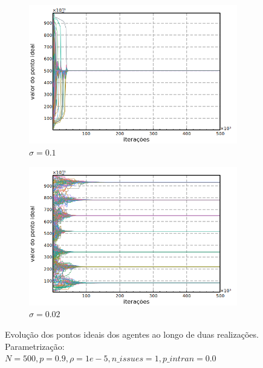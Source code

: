 \begin{figure}[h]
    \centering
    \begin{subfigure}[b]{0.49\textwidth}
      \includegraphics[width=\textwidth]{ims/timeseries1.png}
      \caption{\( \sigma = 0.1\) }
    \end{subfigure}
    \begin{subfigure}[b]{0.49\textwidth}
      \includegraphics[width=\textwidth]{ims/timeseries2.png}
       \caption{\(\sigma = 0.02\) }
      \end{subfigure}
      \caption{Evolução dos pontos ideais dos agentes ao longo de duas realizações.
        Parametrização: \(  N = 500, p = 0.9, \rho =  1e-5, n\_issues = 1 , p\_intra
        n= 0.0 \)}
      \label{fig:tseries1}
    \end{figure}
    
